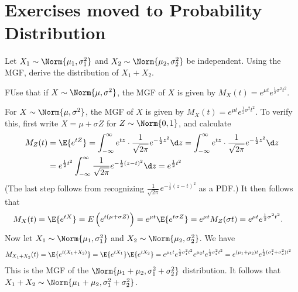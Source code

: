 	
\section{Exercises moved to Probability Distribution}	
	\begin{exercise}\label{ex:chap06:01}
		Let $X_1\sim \Norm{\mu_1, \sigma_1^2}$ and	$X_2\sim \Norm{\mu_2, \sigma_2^2}$ be independent. Using the MGF, derive the distribution of $X_1 + X_2$.
		\begin{hint}
			FUse that if $X \sim \Norm{\mu, \sigma^2}$, the MGF of $X$ is given by $M_X(t) = e^{\mu t} e^{\frac{1}{2} \sigma^2 t^2}$.
		\end{hint}
		\begin{solution}
			For $X \sim \Norm{\mu, \sigma^2}$, the MGF of $X$ is given by $M_X(t) = e^{\mu t} e^{\frac{1}{2} \sigma^2 t^2}$. To verify this, first write $X = \mu + \sigma Z$ for $Z \sim \Norm{0,1}$, and calculate
			\begin{align*}
				M_Z(t) & = \E{e^{tZ}} = \int_{-\infty}^{\infty} e^{tz} \cdot \frac{1}{\sqrt{2 \pi}} e^{-\frac{1}{2} z^2} \d z = \int_{-\infty}^{\infty} e^{tz} \cdot \frac{1}{\sqrt{2 \pi}} e^{-\frac{1}{2} z^2} \d z \\
				& = e^{\frac{1}{2} t^2} \int_{-\infty}^{\infty} \frac{1}{\sqrt{2 \pi}} e^{-\frac{1}{2} (z - t)^2} \d z = e^{\frac{1}{2} t^2}
			\end{align*}
			(The last step follows from recognizing $\frac{1}{\sqrt{2 \pi}} e^{-\frac{1}{2} (z - t)^2}$ as a PDF.) It then follows that
			\begin{align*}
				M_X(t) & = \E{e^{tX}} = E\left(e^{t(\mu + \sigma Z)}\right) = e^{\mu t} \E{e^{t \sigma Z}} = e^{\mu t} M_Z(\sigma t) = e^{\mu t} e^{\frac{1}{2} \sigma^2 t^2}.
			\end{align*}
			Now let $X_1\sim \Norm{\mu_1, \sigma_1^2}$ and $X_2\sim \Norm{\mu_2, \sigma_2^2}$. We have
			\begin{align*}
				M_{X_1 + X_2}(t) & = \E{e^{t(X_1 + X_2)}} = \E{e^{t X_1}} \E{e^{t X_2}} = e^{\mu_1 t} e^{\frac{1}{2} \sigma_1^2 t^2} e^{\mu_2 t} e^{\frac{1}{2} \sigma_2^2 t^2} = e^{(\mu_1 + \mu_2) t} e^{\frac{1}{2} (\sigma_1^2 + \sigma_2^2) t^2}
			\end{align*}
			This is the MGF of the $\Norm{\mu_1 + \mu_2, \sigma_1^2 + \sigma_2^2}$ distribution. It follows that $X_1 + X_2 \sim \Norm{\mu_1 + \mu_2, \sigma_1^2 + \sigma_2^2}$.
		\end{solution}
	\end{exercise}
	
